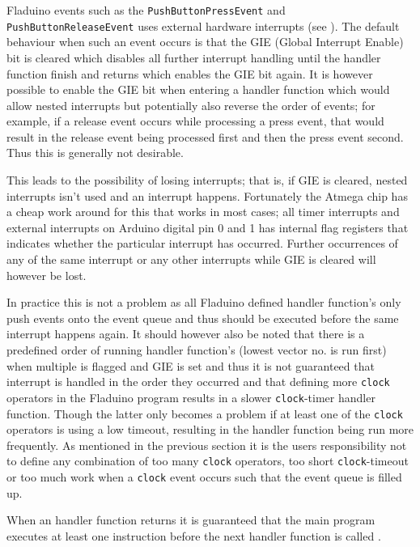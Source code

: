 \documentclass[a4paper, oneside, final]{memoir}
\let\fref\undefined
\begin{document}
Fladuino events such as the \texttt{PushButtonPressEvent} and
\texttt{PushButtonRe\-le\-a\-se\-Event} uses external hardware interrupts (see
\fref{sec:external-interrupts}). The default behaviour when such an event occurs
is that the GIE (Global Interrupt Enable) bit is cleared which disables all
further interrupt handling until the handler function finish and returns which
enables the GIE bit again. It is however possible to enable the GIE bit when
entering a handler function which would allow nested interrupts \cite[Section
4.7 page 14]{atmel8p} but potentially also reverse the order of events; for
example, if a release event occurs while processing a press event, that would
result in the release event being processed first and then the press
event second. Thus this is generally not desirable.

This leads to the possibility of losing interrupts; that is, if GIE is cleared,
nested interrupts isn't used and an interrupt happens. Fortunately the Atmega
chip has a cheap work around for this that works in most cases; all timer
interrupts and external interrupts on Arduino digital pin 0 and 1 has internal
flag registers that indicates whether the particular interrupt has
occurred. Further occurrences of any of the same interrupt or any other
interrupts while GIE is cleared will however be lost.

In practice this is not a problem as all Fladuino defined handler function's
only push events onto the event queue and thus should be executed before the
same interrupt happens again. It should however also be noted that there is a
predefined order of running handler function's \cite[Section 9 page 57]{atmel8p}
(lowest vector no. is run first) when multiple is flagged and GIE is set and
thus it is not guaranteed that interrupt is handled in the order they occurred
and that defining more \texttt{clock} operators in the Fladuino program results
in a slower \texttt{clock}-timer handler function. Though the latter only becomes
a problem if at least one of the \texttt{clock} operators is using a low
timeout, resulting in the handler function being run more frequently. As
mentioned in the previous section it is the users responsibility not to define
any combination of too many \texttt{clock} operators, too short
\texttt{clock}-timeout or too much work when a \texttt{clock} event occurs such
that the event queue is filled up.

When an handler function returns it is guaranteed that the main program executes
at least one instruction before the next handler function is called
\cite[Section 4.7 page 14]{atmel8p}.
\end{document}
